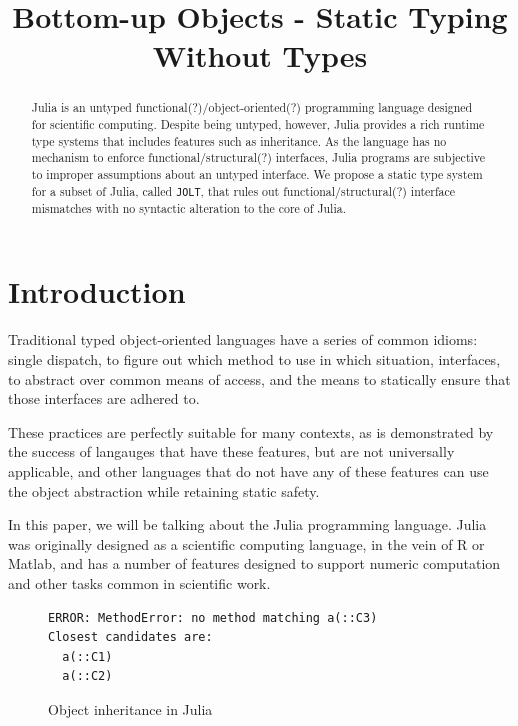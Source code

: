 \documentclass[preprint]{sigplanconf}
\newcommand{\xt}[1]{\texttt{#1}}
\newcommand{\jolt}{\xt{JOLT}}
\begin{document}
\title{Bottom-up Objects - Static Typing Without Types} 
\maketitle

\begin{abstract}
Julia is an untyped functional(?)/object-oriented(?) programming language designed for scientific computing. 
Despite being untyped, however, Julia provides a rich runtime type systems that includes features such as  
inheritance. As the language has no mechanism to enforce functional/structural(?) interfaces, Julia programs 
are subjective to improper assumptions about an untyped interface. We propose a static type system for a 
subset of Julia, called \jolt, that rules out functional/structural(?) interface mismatches
with no syntactic alteration to the core of Julia.
\end{abstract}


\section{Introduction}

Traditional typed object-oriented languages have a series of
common idioms: single dispatch, to figure out which method
to use in which situation, interfaces, to abstract over 
common means of access, and the means to statically
ensure that those interfaces are adhered to.

These practices are perfectly suitable for many contexts,
as is demonstrated by the success of langauges that have 
these features, but are not universally applicable, and
other languages that do not have any of these features
can use the object abstraction while retaining static 
safety.

In this paper, we will be talking about the Julia
programming language. Julia was originally designed
as a scientific computing language, in the vein of 
R or Matlab, and has a number of features designed
to support numeric computation and other tasks common
in scientific work.

\begin{figure}[h]


\begin{Verbatim}[fontsize=\small]
ERROR: MethodError: no method matching a(::C3)
Closest candidates are:
  a(::C1)
  a(::C2)
\end{Verbatim}
\caption{Object inheritance in Julia}
\label{code:broken}
\end{figure}
\end{document}
